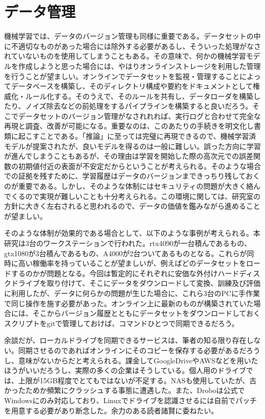 \documentclass[uplatex]{suribt}
\begin{document}
\section{データ管理}
機械学習では、データのバージョン管理も同様に重要である。データセットの中に不適切なものがあった場合には除外する必要があるし、そういった処理がなされていないものを使用してしまうこともある。その意味で、何かの機械学習モデルを作成しようと思った場合には、やはりオンラインストレージを利用した管理を行うことが望ましい。オンラインでデータセットを監視・管理することによってデータベースを構築し、そのディレクトリ構成や要約をドキュメントとして権威化・ルール化する。そのうえで、そのルールを共有し、データローダを構築したり、ノイズ除去などの前処理をするパイプラインを構築すると良いだろう。そこでデータセットのバージョン管理がなされれれば、実行ログと合わせて完全な再現と調査、改善が可能になる。重要なのは、このあたりの手続きを明文化し書類に起こすことである。「推論」に至っては完璧に再現できるので、機械学習済モデルが提案されたが、良いモデルを得るのは一般に難しい。誤った方向に学習が進んでしまうこともあるが、その理由は学習を開始した際の高次元での誤差関数の初期値付近の表面が不安定だからということが考えられる。そのような場合での証拠を残すために、学習履歴はデータのバージョンまできっちり残しておくのが重要である。しかし、そのような体制にはセキュリティの問題が大きく絡んでくるので実現が難しいことも十分考えられる。この環境に関しては、研究室の方針に大きく左右されると思われるので、データの価値を鑑みながら進めることが望ましい。\par
そのような体制が効果的である場合として、以下のような事例が考えられる。本研究は3台のワークステーションで行われた。rtx4090が一台積んであるもの、gtx1080が3台積んであるもの、A4000が2台ついてあるものとなる。これらが同時に高い稼働率を持っていることが望ましいが、例えばどのデータセットをロードするのかが問題となる。今回は暫定的にそれぞれに安価な外付けハードディスクドライブを取り付けて、そこにデータをダウンロードして変換、訓練及び評価に利用したが、データに何らかの問題が生じた場合に、これら3台のPCに手作業で同じ操作を施す必要があった。オンライン上に最新のものが構築されていた場合には、そこからバージョン履歴とともにデータセットをダウンロードしておくスクリプトをgitで管理しておけば、コマンドひとつで同期できるだろう。\par
余談だが、ローカルドライブを同期できるサービスは、筆者の知る限り存在しない。同期させるのであればオンラインにそのコピーを保存する必要があるだろうし、意味がないからだと考えられる。課金してGoogleDriveやAWSなどを用いたほうがいいだろうし、実際の多くの企業はそうしている。個人用のドライブでは、上限が15GB程度でとてもではないが不足する。NASも使用していたが、古かったためか頻繁にクラッシュする事態に遭遇した。また、Droboは公式でWindowsにのみ対応しており、Linuxでドライブを認識させるには自前でパッチを用意する必要があり断念した。余力のある読者諸賢に委ねたい。\par
\end{document}
